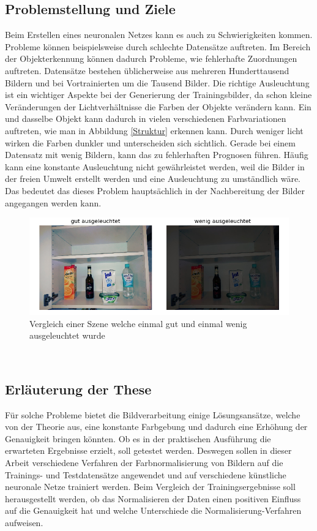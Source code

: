 \documentclass[a4paper,12pt,oneside]{article}
\begin{document}
  \subsection{Problemstellung und Ziele}\label{s.probuziel}
Beim Erstellen eines neuronalen Netzes kann es auch zu Schwierigkeiten kommen. Probleme können beispielsweise durch schlechte Datensätze auftreten. Im Bereich der Objekterkennung können dadurch Probleme, wie fehlerhafte Zuordnungen auftreten. Datensätze bestehen üblicherweise aus mehreren Hunderttausend Bildern und bei Vortrainierten um die Tausend Bilder. Die richtige Ausleuchtung ist ein wichtiger Aspekte bei der Generierung der Trainingsbilder, da schon kleine Veränderungen der Lichtverhältnisse die Farben der Objekte verändern kann. Ein und dasselbe Objekt kann dadurch in vielen verschiedenen Farbvariationen auftreten, wie man in Abbildung \ref{Struktur} erkennen kann. Durch weniger licht wirken die Farben dunkler und unterscheiden sich sichtlich. Gerade bei einem Datensatz mit wenig Bildern, kann das zu fehlerhaften Prognosen führen. Häufig kann eine konstante Ausleuchtung nicht gewährleistet werden, weil die Bilder in der freien Umwelt erstellt werden und eine Ausleuchtung zu umständlich wäre. Das bedeutet das dieses Problem hauptsächlich in der Nachbereitung der Bilder angegangen werden kann.
\begin{figure}
	[h]
	\centering
	\includegraphics[scale=0.7]{Sources/Vergleich.png}
	\caption{Vergleich einer Szene welche einmal gut und einmal wenig ausgeleuchtet wurde}
	\label{img:neuron}
\end{figure}\\
  \subsection{Erläuterung der These}\label{s.these}
Für solche Probleme bietet die Bildverarbeitung einige Lösungsansätze, welche von der Theorie aus, eine konstante Farbgebung und dadurch eine Erhöhung der Genauigkeit bringen könnten. Ob es in der praktischen Ausführung die erwarteten Ergebnisse erzielt, soll getestet werden. Deswegen sollen in dieser Arbeit verschiedene Verfahren der Farbnormalisierung von Bildern auf die Trainings- und Testdatensätze angewendet und auf verschiedene künstliche neuronale Netze trainiert werden. Beim Vergleich der Trainingsergebnisse soll herausgestellt werden, ob das Normalisieren der Daten einen positiven Einfluss auf die Genauigkeit hat und welche Unterschiede die Normalisierung-Verfahren aufweisen.\\
\end{document}
